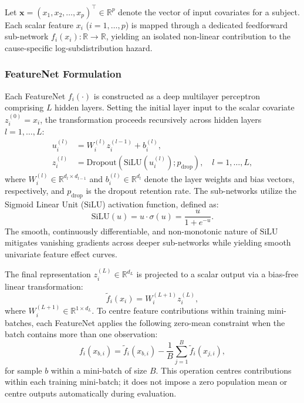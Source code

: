 \documentclass[a4paper,twoside,12pt]{report}
\begin{document}
Let $\mathbf{x} = (x_1, x_2, \dots, x_p)^\top \in \mathbb{R}^p$ denote the vector of input covariates for a subject. Each scalar feature $x_i$ ($i = 1, \dots, p$) is mapped through a dedicated feedforward sub-network $f_i(x_i): \mathbb{R} \to \mathbb{R}$, yielding an isolated non-linear contribution to the cause-specific log-subdistribution hazard.

\subsubsection{FeatureNet Formulation}
Each FeatureNet $f_i(\cdot)$ is constructed as a deep multilayer perceptron comprising $L$ hidden layers. Setting the initial layer input to the scalar covariate $z_i^{(0)} = x_i$, the transformation proceeds recursively across hidden layers $l = 1, \dots, L$:
\begin{align}
    u_i^{(l)} &= W_i^{(l)} z_i^{(l-1)} + b_i^{(l)}, \\
    z_i^{(l)} &= \text{Dropout}\left( \text{SiLU}\left(u_i^{(l)}\right); p_{\text{drop}} \right), \quad l = 1, \dots, L,
\end{align}
where $W_i^{(l)} \in \mathbb{R}^{d_l \times d_{l-1}}$ and $b_i^{(l)} \in \mathbb{R}^{d_l}$ denote the layer weights and bias vectors, respectively, and $p_{\text{drop}}$ is the dropout retention rate. The sub-networks utilize the Sigmoid Linear Unit ($\text{SiLU}$) activation function, defined as:
\begin{equation}
    \text{SiLU}(u) = u \cdot \sigma(u) = \frac{u}{1 + e^{-u}}.
\end{equation}
The smooth, continuously differentiable, and non-monotonic nature of $\text{SiLU}$ mitigates vanishing gradients across deeper sub-networks while yielding smooth univariate feature effect curves.

The final representation $z_i^{(L)} \in \mathbb{R}^{d_L}$ is projected to a scalar output via a bias-free linear transformation:
\begin{equation}
    \tilde{f}_i(x_i) = W_i^{(L+1)} z_i^{(L)},
\end{equation}
where $W_i^{(L+1)} \in \mathbb{R}^{1 \times d_L}$. To centre feature contributions within training mini-batches, each FeatureNet applies the following zero-mean constraint when the batch contains more than one observation:
\begin{equation}
    f_i(x_{b,i}) = \tilde{f}_i(x_{b,i}) - \frac{1}{B} \sum_{j=1}^B \tilde{f}_i(x_{j,i}),
\end{equation}
for sample $b$ within a mini-batch of size $B$. This operation centres contributions within each training mini-batch; it does not impose a zero population mean or centre outputs automatically during evaluation.
\end{document}
